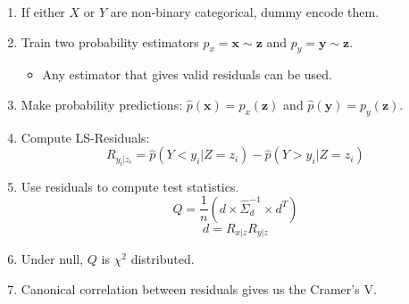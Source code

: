 \documentclass{beamer}
\begin{document}
\begin{frame}
	\frametitle{}
	\begin{enumerate}
		\item If either $ X $ or $ Y $ are non-binary categorical, dummy encode them.
		\item Train two probability estimators $ p_x = \bm{x} \sim \bm{z} $ and
			$ p_y = \bm{y} \sim \bm{z} $.
			\begin{itemize}
				\item Any estimator that gives valid residuals can be used.
			\end{itemize}
		\item Make probability predictions:
			$ \hat{p}(\bm{x}) = p_x(\bm{z}) $ and $ \hat{p}(\bm{y}) = p_y(\bm{\bm{z}}) $.
		\item Compute LS-Residuals:
			$$ R_{y_i | z_i} = \hat{p}(Y < y_i | Z=z_i) - \hat{p}(Y>y_i|Z=z_i) $$
		\item Use residuals to compute test statistics.
			$$ Q = \frac{1}{n} (d \times \hat{\Sigma}_d^{-1} \times d^T) $$
			$$ d = R_{x|z} R_{y|z} $$
		\item Under null, $ Q $ is $ \chi^2 $ distributed.
		\item Canonical correlation between residuals gives us the Cramer's V.
	\end{enumerate}
\end{frame}
\end{document}
